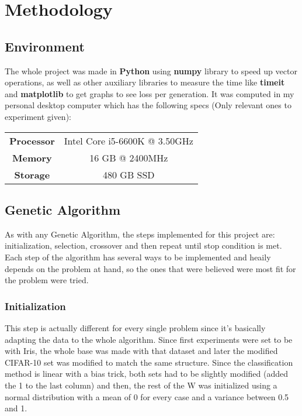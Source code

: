 \documentclass[conference,compsoc]{IEEEtran}
\begin{document}
\section{Methodology}
\subsection{Environment}
The whole project was made in \textbf{Python} using \textbf{numpy} library to speed up vector operations, as well as other auxiliary libraries to measure the time like \textbf{timeit} and \textbf{matplotlib} to get graphs to see loss per generation. It was computed in my personal desktop computer which has the following specs (Only relevant ones to experiment given):

\begin{center}
\begin{tabular}{ c c }
 \textbf{Processor} & Intel Core i5-6600K @ 3.50GHz \\ 
 \textbf{Memory} & 16 GB @ 2400MHz \\  
 \textbf{Storage} & 480 GB SSD
\end{tabular}
\end{center}

\subsection{Genetic Algorithm}
As with any Genetic Algorithm, the steps implemented for this project are: initialization, selection, crossover and then repeat until stop condition is met. Each step of the algorithm has several ways to be implemented and heaily depends on the problem at hand, so the ones that were believed were most fit for the problem were tried.

\subsubsection{Initialization}
This step is actually different for every single problem since it's basically adapting the data to the whole algorithm. Since first experiments were set to be with Iris, the whole base was made with that dataset and later the modified CIFAR-10 set was modified to match the same structure. Since the classification method is linear with a bias trick, both sets had to be slightly modified (added the 1 to the last column) and then, the rest of the W was initialized using a normal distribution with a mean of 0 for every case and a variance between 0.5 and 1.
\end{document}
